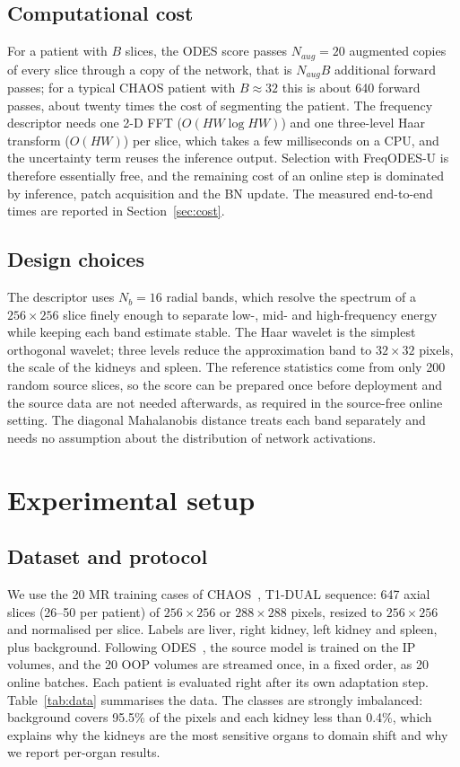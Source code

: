 \documentclass[a4paper,fleqn]{cas-dc}
\begin{document}
\subsection{Computational cost}
For a patient with $B$ slices, the ODES score passes $N_{aug}=20$ augmented copies of every slice through a copy of the network, that is $N_{aug}B$ additional forward passes; for a typical CHAOS patient with $B\approx32$ this is about 640 forward passes, about twenty times the cost of segmenting the patient. The frequency descriptor needs one 2-D FFT ($O(HW\log HW)$) and one three-level Haar transform ($O(HW)$) per slice, which takes a few milliseconds on a CPU, and the uncertainty term reuses the inference output. Selection with FreqODES-U is therefore essentially free, and the remaining cost of an online step is dominated by inference, patch acquisition and the BN update. The measured end-to-end times are reported in Section~\ref{sec:cost}.

\subsection{Design choices}
The descriptor uses $N_b=16$ radial bands, which resolve the spectrum of a $256\times256$ slice finely enough to separate low-, mid- and high-frequency energy while keeping each band estimate stable. The Haar wavelet is the simplest orthogonal wavelet; three levels reduce the approximation band to $32\times32$ pixels, the scale of the kidneys and spleen. The reference statistics come from only 200 random source slices, so the score can be prepared once before deployment and the source data are not needed afterwards, as required in the source-free online setting. The diagonal Mahalanobis distance treats each band separately and needs no assumption about the distribution of network activations.

\section{Experimental setup}
\subsection{Dataset and protocol}
We use the 20 MR training cases of CHAOS~\cite{kavur2021chaos}, T1-DUAL sequence: 647 axial slices (26--50 per patient) of $256\times256$ or $288\times288$ pixels, resized to $256\times256$ and normalised per slice. Labels are liver, right kidney, left kidney and spleen, plus background. Following ODES~\cite{islam2025odes}, the source model is trained on the IP volumes, and the 20 OOP volumes are streamed once, in a fixed order, as 20 online batches. Each patient is evaluated right after its own adaptation step. Table~\ref{tab:data} summarises the data. The classes are strongly imbalanced: background covers 95.5\% of the pixels and each kidney less than 0.4\%, which explains why the kidneys are the most sensitive organs to domain shift and why we report per-organ results.
\end{document}
